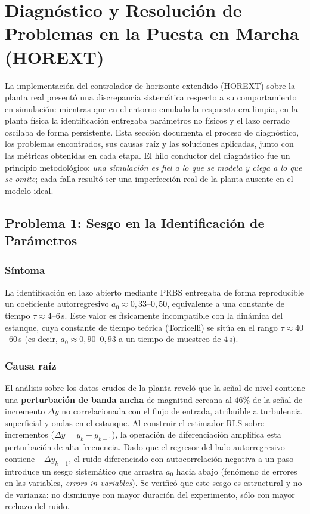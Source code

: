 \clearpage
\section{Diagnóstico y Resolución de Problemas en la Puesta en Marcha (HOREXT)}

La implementación del controlador de horizonte extendido (HOREXT) sobre la planta real presentó una discrepancia sistemática respecto a su comportamiento en simulación: mientras que en el entorno emulado la respuesta era limpia, en la planta física la identificación entregaba parámetros no físicos y el lazo cerrado oscilaba de forma persistente. Esta sección documenta el proceso de diagnóstico, los problemas encontrados, sus causas raíz y las soluciones aplicadas, junto con las métricas obtenidas en cada etapa. El hilo conductor del diagnóstico fue un principio metodológico: \textit{una simulación es fiel a lo que se modela y ciega a lo que se omite}; cada falla resultó ser una imperfección real de la planta ausente en el modelo ideal.

\subsection{Problema 1: Sesgo en la Identificación de Parámetros}

\subsubsection{Síntoma}
La identificación en lazo abierto mediante PRBS entregaba de forma reproducible un coeficiente autorregresivo $a_0 \approx 0{,}33$--$0{,}50$, equivalente a una constante de tiempo $\tau \approx 4$--$6\,$s. Este valor es físicamente incompatible con la dinámica del estanque, cuya constante de tiempo teórica (Torricelli) se sitúa en el rango $\tau \approx 40$--$60\,$s (es decir, $a_0 \approx 0{,}90$--$0{,}93$ a un tiempo de muestreo de $4\,$s).

\subsubsection{Causa raíz}
El análisis sobre los datos crudos de la planta reveló que la señal de nivel contiene una \textbf{perturbación de banda ancha} de magnitud cercana al $46\%$ de la señal de incremento $\Delta y$ no correlacionada con el flujo de entrada, atribuible a turbulencia superficial y ondas en el estanque. Al construir el estimador RLS sobre incrementos ($\Delta y = y_k - y_{k-1}$), la operación de diferenciación amplifica esta perturbación de alta frecuencia. Dado que el regresor del lado autorregresivo contiene $-\Delta y_{k-1}$, el ruido diferenciado con autocorrelación negativa a un paso introduce un sesgo sistemático que arrastra $a_0$ hacia abajo (fenómeno de errores en las variables, \textit{errors-in-variables}). Se verificó que este sesgo es estructural y no de varianza: no disminuye con mayor duración del experimento, sólo con mayor rechazo del ruido.

